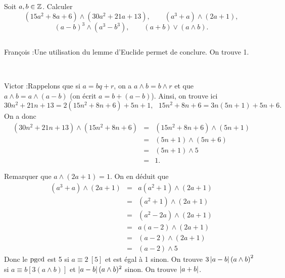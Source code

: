 \documentclass{magnolia}
\begin{document}
Soit $a, b\in\mathbb{Z}$. Calculer
\[(15a^2+8a+6)\wedge(30a^2+21a+13), \qquad (a^3+a)\wedge(2a+1),\]
\[(a-b)^3 \wedge (a^3-b^3), \qquad (a+b)\vee (a \wedge b).\]
\begin{sol}
$\quad$
\begin{questions}
\question 
\begin{francois}
François :Une utilisation du lemme d'Euclide permet de conclure. On trouve 1.
\end{francois}\\
\begin{victor}
Victor :Rappelons que si $a=bq+r$, on a $a\wedge b=b\wedge r$ et que $a\wedge b=a\wedge (a-b)$ (on écrit $a=b+(a-b)$).
Ainsi, on trouve ici
$$30n^2+21n+13=2(15n^2+8n+6)+5n+1,\ \ \ 15n^2+8n+6=3n(5n+1)+5n+6.$$
On a donc
\begin{eqnarray*}
(30n^2+21n+13)\wedge (15n^2+8n+6)&=&(15n^2+8n+6)\wedge (5n+1)\\
&=&(5n+1)\wedge (5n+6)\\
&=&(5n+1)\wedge 5\\
&=&1.
\end{eqnarray*}
\end{victor}
\question Remarquer que $a\wedge (2a+1)=1$. On en déduit que
  \begin{eqnarray*}
  (a^3+a)\wedge (2a+1)
  &=& a(a^2+1)\wedge (2a+1)\\
  &=& (a^2+1)\wedge (2a+1)\\
  &=& (a^2-2a)\wedge (2a+1)\\
  &=& a(a-2)\wedge (2a+1)\\
  &=& (a-2)\wedge (2a+1)\\
  &=& (a-2)\wedge 5
  \end{eqnarray*}
  Donc le $\operatorname{pgcd}$ est 5 si $a\equiv 2\ [5]$ et est égal à 1 sinon.
\question On trouve $3\left|a-b\right|\left(a\wedge b\right)^2$ si $a\equiv b [3(a\wedge b)]$
  et $\left|a-b\right|(a\wedge b)^2$ sinon.
\question On trouve $\left|a+b\right|$.
\end{questions}
\end{sol}


\end{document}
